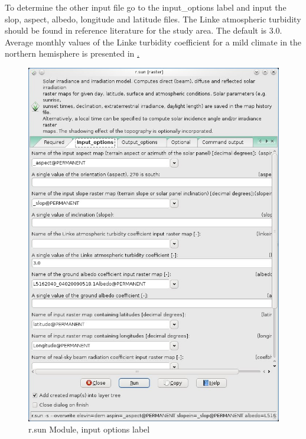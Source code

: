 To determine the other input file go to the input\_options label and input the slop, aspect, albedo, longitude and latitude files. The Linke atmospheric turbidity should be found in reference literature for the study area. The default is 3.0. Average monthly values of the Linke turbidity coefficient for a mild climate in the northern hemisphere is presented in \href{tab:001}.\newline

\begin{figure}[htbp]
   \centering
   \includegraphics[scale=0.4]{gipe023.png}
   \caption{r.sun Module, input options label}
   \label{fig:gipe023}
\end{figure}

